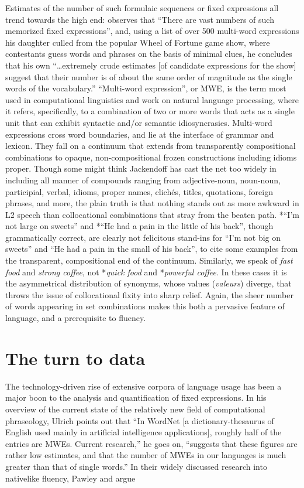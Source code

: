 \documentclass[english,output=paper,colorlinks,citecolor=brown]{../langscibook}
\begin{document}
Estimates of the number of such formulaic sequences or fixed expressions all trend towards the high end: \citet[156]{Jackendoff1997} observes that “There are vast numbers of such memorized fixed expressions”, and, using a list of over 500 multi-word expressions his daughter culled from the popular Wheel of Fortune game show, where contestants guess words and phrases on the basis of minimal clues, he concludes that his own “…extremely crude estimates [of candidate expressions for the show] suggest that their number is of about the same order of magnitude as the single words of the vocabulary.” ``Multi-word expression'', or MWE, is the term most used in computational linguistics and work on natural language processing, where it refers, specifically, to a combination of two or more words that acts as a single unit that can exhibit syntactic and/or semantic idiosyncrasies. Multi-word expressions cross word boundaries, and lie at the interface of grammar and lexicon. They fall on a continuum that extends from transparently compositional combinations to opaque, non-compositional frozen constructions including idioms proper. Though some might think Jackendoff has cast the net too widely in including all manner of compounds ranging from adjective-noun, noun-noun, participial, verbal, idioms, proper names, clichés, titles, quotations, foreign phrases, and more, the plain truth is that nothing stands out as more awkward in L2 speech than collocational combinations that stray from the beaten path. *“I’m not large on sweets” and *“He had a pain in the little of his back”, though grammatically correct, are clearly not felicitous stand-ins for “I’m not big on sweets” and “He had a pain in the small of his back”, to cite some examples from the transparent, compositional end of the continuum. Similarly, we speak of \textit{fast food} and \textit{strong coffee}, not *\textit{quick food} and *\textit{powerful coffee}. In these cases it is the asymmetrical distribution of synonyms, whose values (\textit{valeurs}) diverge, that throws the issue of collocational fixity into sharp relief. Again, the sheer number of words appearing in set combinations makes this both a pervasive feature of language, and a prerequisite to fluency. 

\section{The turn to data}

The technology-driven rise of extensive corpora of language usage has been a major boon to the analysis and quantification of fixed expressions. In his overview of the current state of the relatively new field of computational phraseology, Ulrich \citet[348]{Heid2008} points out that “In WordNet [a dictionary-thesaurus of English used mainly in artificial intelligence applications], roughly half of the entries are MWEs. Current research,” he goes on, “suggests that these figures are rather low estimates, and that the number of MWEs in our languages is much greater than that of single words.” In their widely discussed research into nativelike fluency, Pawley and \citet[191--192]{RichardsSchmidt1983} argue 
\end{document}
